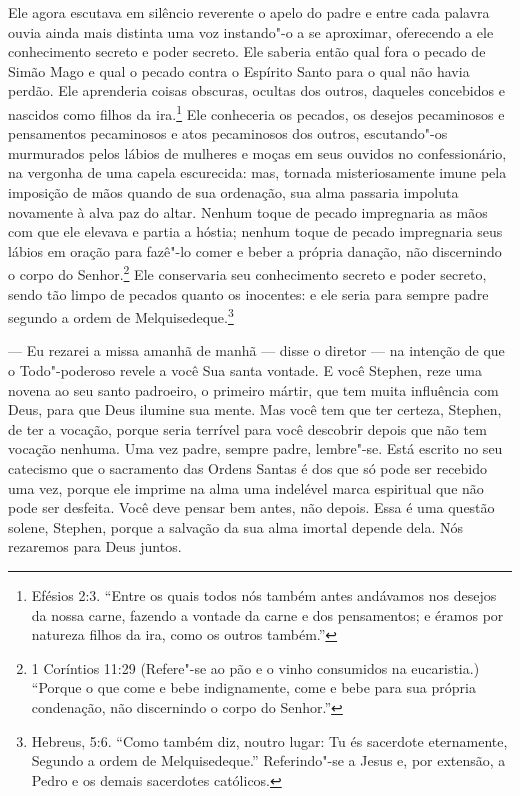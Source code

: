 Ele agora escutava em silêncio reverente o apelo do padre e entre cada
palavra ouvia ainda mais distinta uma voz instando"-o a se aproximar,
oferecendo a ele conhecimento secreto e poder secreto. Ele saberia
então qual fora o pecado de Simão Mago e qual o pecado contra o
Espírito Santo para o qual não havia perdão. Ele aprenderia coisas
obscuras, ocultas dos outros, daqueles concebidos e nascidos como
filhos da ira.\footnote{ Efésios 2:3. “Entre os quais todos nós também
antes andávamos nos desejos da nossa carne, fazendo a vontade da carne
e dos pensamentos; e éramos por natureza filhos da ira, como os outros
também.”} Ele conheceria os pecados, os desejos pecaminosos e
pensamentos pecaminosos e atos pecaminosos dos outros, escutando"-os
murmurados pelos lábios de mulheres e moças em seus ouvidos no
confessionário, na vergonha de uma capela escurecida: mas, tornada
misteriosamente imune pela imposição de mãos quando de sua ordenação,
sua alma passaria impoluta novamente à alva paz do altar. Nenhum toque
de pecado impregnaria as mãos com que ele elevava e partia a hóstia;
nenhum toque de pecado impregnaria seus lábios em oração para fazê"-lo
comer e beber a própria danação, não discernindo o corpo do
Senhor.\footnote{ 1 Coríntios 11:29 (Refere"-se ao pão e o vinho
consumidos na eucaristia.) “Porque o que come e bebe indignamente, come
e bebe para sua própria condenação, não discernindo o corpo do Senhor.”} 
Ele conservaria seu conhecimento secreto e poder secreto, sendo tão
limpo de pecados quanto os inocentes: e ele seria para sempre padre
segundo a ordem de Melquisedeque.\footnote{ Hebreus, 5:6. “Como também
diz, noutro lugar: Tu és sacerdote eternamente, Segundo a ordem de
Melquisedeque.” Referindo"-se a Jesus e, por extensão, a Pedro e os
demais sacerdotes católicos.}

 --- Eu rezarei a missa amanhã de manhã --- disse o diretor --- na intenção de
 que o Todo"-poderoso revele a você Sua santa vontade. E você Stephen,
reze uma novena ao seu santo padroeiro, o primeiro mártir, que tem
muita influência com Deus, para que Deus ilumine sua mente. Mas você
tem que ter certeza, Stephen, de ter a vocação, porque seria terrível
para você descobrir depois que não tem vocação nenhuma. Uma vez padre,
sempre padre, lembre"-se. Está escrito no seu catecismo que o sacramento
das Ordens Santas é dos que só pode ser recebido uma vez, porque ele
imprime na alma uma indelével marca espiritual que não pode ser
desfeita. Você deve pensar bem antes, não depois. Essa é uma questão
solene, Stephen, porque a salvação da sua alma imortal depende dela.
Nós rezaremos para Deus juntos.

